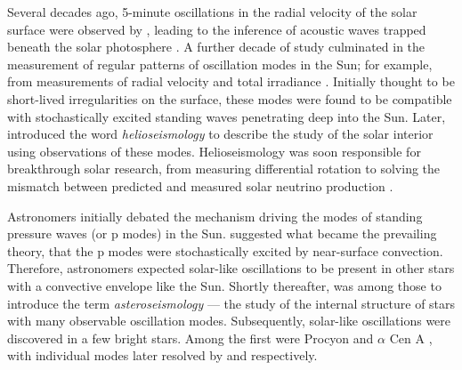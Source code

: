 Several decades ago, 5-minute oscillations in the radial velocity of the solar surface were observed by \citet{Leighton.Noyes.ea1962}, leading to the inference of acoustic waves trapped beneath the solar photosphere \citep{Ulrich1970}. A further decade of study culminated in the measurement of regular patterns of oscillation modes in the Sun; for example, from measurements of radial velocity \citep{Claverie.Isaak.ea1979} and total irradiance \citep{Woodard.Hudson1983a}. Initially thought to be short-lived irregularities on the surface, these modes were found to be compatible with stochastically excited standing waves penetrating deep into the Sun. Later, \citet{Deubner.Gough1984} introduced the word \emph{helioseismology} to describe the study of the solar interior using observations of these modes. Helioseismology was soon responsible for breakthrough solar research, from measuring differential rotation \citep{Deubner.Ulrich.ea1979} to solving the mismatch between predicted and measured solar neutrino production \citep{Bahcall.Ulrich1988}.

Astronomers initially debated the mechanism driving the modes of standing pressure waves (or p modes) in the Sun. \citet{Goldreich.Keeley1977} suggested what became the prevailing theory, that the p modes were stochastically excited by near-surface convection. Therefore, astronomers expected solar-like oscillations to be present in other stars with a convective envelope like the Sun. Shortly thereafter, \citet{Christensen-Dalsgaard1984} was among those to introduce the term \emph{asteroseismology} --- the study of the internal structure of stars with many observable oscillation modes. Subsequently, solar-like oscillations were discovered in a few bright stars. Among the first were Procyon and \(\alpha\) Cen A \citep{Gelly.Grec.ea1986}, with individual modes later resolved by \citet{Martic.Schmitt.ea1999} and \citet{Bouchy.Carrier2001} respectively.

